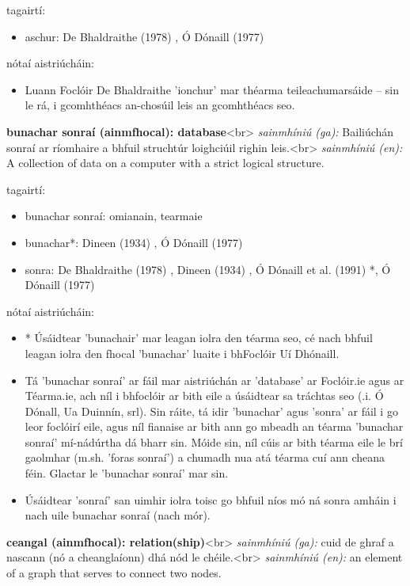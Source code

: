 \documentclass{article}
\begin{document}
tagairtí:
\begin{itemize}
	\item aschur: De Bhaldraithe (1978) \cite{de-bhaldraithe}, Ó Dónaill (1977) \cite{odonaill}
\end{itemize}

nótaí aistriúcháin:
\begin{itemize}
	\item Luann Foclóir De Bhaldraithe 'ionchur' mar théarma teileachumarsáide -- sin le rá, i gcomhthéacs an-chosúil leis an gcomhthéacs seo.
\end{itemize}


\textbf{bunachar sonraí (ainmfhocal): database}<br>
\textit{sainmhíniú (ga):} Bailiúchán sonraí ar ríomhaire a bhfuil struchtúr loighciúil righin leis.<br>
\textit{sainmhíniú (en):} A collection of data on a computer with a strict logical structure.

tagairtí:
\begin{itemize}
	\item bunachar sonraí: omianain, tearmaie
	\item bunachar*: Dineen (1934) \cite{dineen}, Ó Dónaill (1977) \cite{odonaill}
	\item sonra: De Bhaldraithe (1978) \cite{de-bhaldraithe}, Dineen (1934) \cite{dineen}, Ó Dónaill et al. (1991) \cite{focloir-beag}*, Ó Dónaill (1977) \cite{odonaill}
\end{itemize}

nótaí aistriúcháin:
\begin{itemize}
	\item * Úsáidtear 'bunachair' mar leagan iolra den téarma seo, cé nach bhfuil leagan iolra den fhocal 'bunachar' luaite i bhFoclóir Uí Dhónaill.
	\item Tá 'bunachar sonraí' ar fáil mar aistriúchán ar 'database' ar Foclóir.ie agus ar Téarma.ie, ach níl i bhfoclóir ar bith eile a úsáidtear sa tráchtas seo (.i. Ó Dónall, Ua Duinnín, srl). Sin ráite, tá idir 'bunachar' agus 'sonra' ar fáil i go leor foclóirí eile, agus níl fianaise ar bith ann go mbeadh an téarma 'bunachar sonraí' mí-nádúrtha dá bharr sin. Móide sin, níl cúis ar bith téarma eile le brí gaolmhar (m.sh. 'foras sonraí') a chumadh nua atá téarma cuí ann cheana féin. Glactar le 'bunachar sonraí' mar sin.
	\item Úsáidtear 'sonraí' san uimhir iolra toisc go bhfuil níos mó ná sonra amháin i nach uile bunachar sonraí (nach mór).
\end{itemize}


\textbf{ceangal (ainmfhocal): relation(ship)}<br>
\textit{sainmhíniú (ga):} cuid de ghraf a nascann (nó a cheanglaíonn) dhá nód le chéile.<br>
\textit{sainmhíniú (en):} an element of a graph that serves to connect two nodes.
\end{document}
